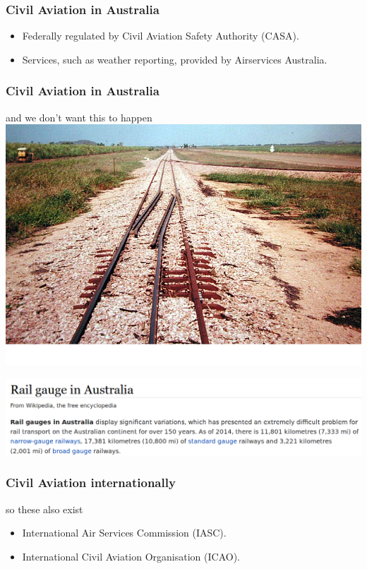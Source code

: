 \begin{frame}
\frametitle{Civil Aviation in Australia}
\begin{itemize}
\item<1-> Federally regulated by Civil Aviation Safety Authority (CASA).
\item<2-> Services, such as weather reporting, provided by Airservices
          Australia.
\end{itemize}
\end{frame}

\begin{frame}
\frametitle{Civil Aviation in Australia}
\begin{block}{and we don't want this to happen}
\includegraphics[height=0.5\textheight]{image/railway-gauge.png}
\end{block}
\begin{block}{}
\includegraphics[height=0.2\textheight]{image/railway-gauge-wikipedia.png}
\end{block}
\end{frame}

\begin{frame}
\frametitle{Civil Aviation internationally}
\begin{block}{so these also exist}
\begin{itemize}
\item<1-> International Air Services Commission (IASC).
\item<2-> International Civil Aviation Organisation (ICAO).
\end{itemize}
\end{block}
\end{frame}

